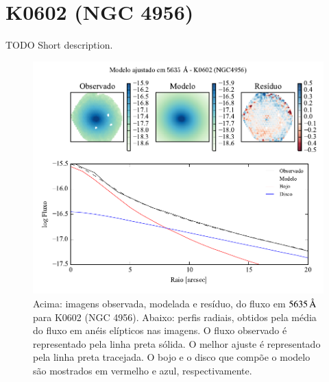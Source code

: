 
\section{K0602 (NGC 4956)}
\label{apendice:Decomp:K0602}

TODO Short description.

\begin{figure}
	\includegraphics[page=1]{figuras-decomp/K0602_sample006a}
	\caption[Ajuste morfológico em $5635\,\angstrom$ de K0602 (NGC 4956)]
	{Acima: imagens observada, modelada e resíduo, do fluxo em $5635\,\angstrom$
	para K0602 (NGC 4956). Abaixo: perfis radiais, obtidos pela média do fluxo em
	anéis elípticos nas imagens. O fluxo observado é representado pela linha preta
	sólida. O melhor ajuste é representado pela linha preta tracejada. O bojo e o
	disco que compõe o modelo são mostrados em vermelho e azul, respectivamente.}
	\label{fig:decompRadprof:K0602}
\end{figure}

